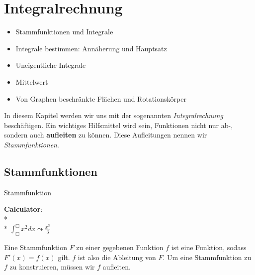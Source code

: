 \chapter{Integralrechnung}
\begin{inhalt}
  \begin{itemize}
    \item Stammfunktionen und Integrale
    \item Integrale bestimmen: Annäherung und Hauptsatz
    \item Uneigentliche Integrale
    \item Mittelwert
    \item Von Graphen beschränkte Flächen und Rotationskörper
  \end{itemize}
\end{inhalt}

In diesem Kapitel werden wir uns mit der sogenannten \emph{Integralrechnung} beschäftigen. Ein wichtiges Hilfsmittel wird sein, Funktionen nicht nur ab-, sondern auch \textbf{aufleiten} zu können. Diese Aufleitungen nennen wir \emph{Stammfunktionen}.

\section{Stammfunktionen}

\begin{bla}{Stammfunktion}
  \begin{marginfigure}
    \begin{tcolorbox}[colback=white!95!black,colframe=white!75!black,title=CAS:,arc=0mm]
      \begin{scriptsize}
        \textbf{Calculator}: \\*
         \\*
        \hfill \( \int_{\Box}^{\Box}x^2 dx \leadsto \tfrac{x^3}{3} \)
      \end{scriptsize}
    \end{tcolorbox}
  \end{marginfigure}
  Eine Stammfunktion $F$ zu einer gegebenen Funktion $f$ ist eine Funktion, sodass $F'(x)=f(x)$ gilt. $f$ ist also die Ableitung von $F$. Um eine Stammfunktion zu $f$ zu konstruieren, müssen wir $f$ aufleiten.
\end{bla}

